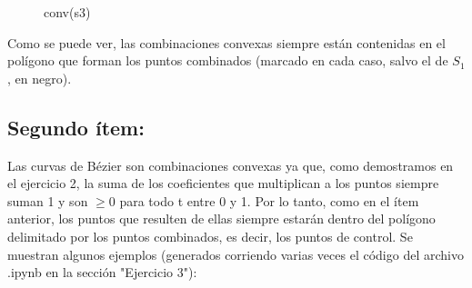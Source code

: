 \documentclass{article}
\begin{document}
\begin{figure}[H]
\begin{minipage}{0.45\textwidth}
        \caption{conv(s3)}
        \label{fig:grafico3}
    \end{minipage}
    \label{fig:tres_graficos}
\end{figure}

Como se puede ver, las combinaciones convexas siempre están contenidas en el polígono que forman los puntos combinados (marcado en cada caso, salvo el de $S_1$, en negro).

\subsection*{Segundo ítem:}
Las curvas de Bézier son combinaciones convexas ya que, como demostramos en el ejercicio 2, la suma de los coeficientes que multiplican a los puntos siempre suman 1 y son $\geq 0$ para todo t entre 0 y 1. Por lo tanto, como en el ítem anterior, los puntos que resulten de ellas siempre estarán dentro del polígono delimitado por los puntos combinados, es decir, los puntos de control. Se muestran algunos ejemplos (generados corriendo varias veces el código del archivo .ipynb en la sección "Ejercicio 3"):
\end{document}
